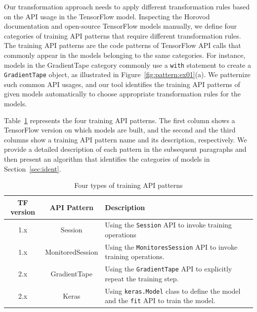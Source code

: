 Our transformation approach needs to apply different transformation rules based
on the API usage in the TensorFlow model. 
Inspecting the Horovod documentation and open-source TensorFlow models
manually, we define four categories of training API patterns that require
different transformation rules. 
The training API patterns are the code patterns of TensorFlow API calls that
commonly appear in the models belonging to the same categories.
For instance, models in the {GradientTape} category commonly use a {\tt with}
statement to create a {\tt GradientTape} object, as illustrated in
Figure~\ref{fig:pattern:ex01}(a).
We patternize such common API usages, and our tool identifies the training API
patterns of given models automatically to choose appropriate transformation
rules for the models.

Table~\ref{tab:patterns} represents the four training API patterns. 
The first column shows a TensorFlow version on which models are built, and the
second and the third columns show a training API pattern name and its
description, respectively.
We provide a detailed description of each pattern in the subsequent paragraphs
and then present an algorithm that identifies the categories of models in
Section~\ref{sec:ident}.


\begin{table}[ht!]
  \centering
  \begin{tabular}{|c|c|l|}
    \hline
    TF version & API Pattern & Description \\
    \hline
    1.x & Session & 
	  Using the {\tt Session} API to invoke training operations\\
    \hline
    1.x & MonitoredSession & 
      Using the {\tt MonitoresSession} API to invoke training operations.\\
    \hline
    2.x & GradientTape & 
      Using the {\tt GradientTape} API to explicitly repeat the training
      step.\\
    \hline
    2.x & Keras & 
      Using {\tt keras.Model} class to define the model and the {\tt fit} API
      to train the model.\\
    \hline
  \end{tabular}
  \caption{Four types of training API patterns}
  \label{tab:patterns}
\end{table}


